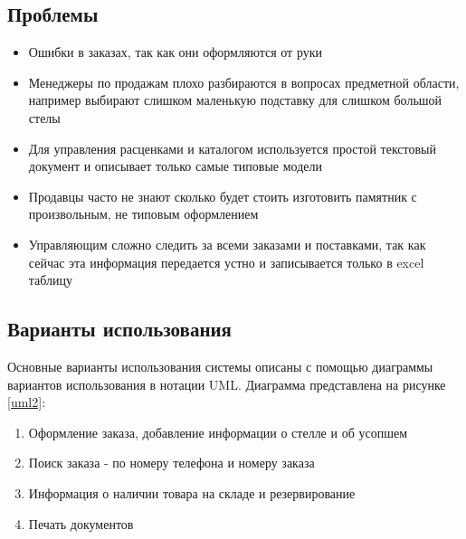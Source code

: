 \documentclass[a4paper,article,14pt]{extarticle}
\begin{document}
\subsection{Проблемы}
\begin{itemize}
    \item Ошибки в заказах, так как они оформляются от руки
    \item Менеджеры по продажам плохо разбираются в вопросах предметной области, 
    например выбирают слишком маленькую подставку для слишком большой стелы
    \item Для управления расценками и каталогом используется простой текстовый документ и описывает только самые типовые модели
    \item Продавцы часто не знают сколько будет стоить изготовить памятник с произвольным, не типовым оформлением
    \item Управляющим сложно следить за всеми заказами и поставками, 
    так как сейчас эта информация передается устно и записывается только в excel таблицу
\end{itemize}

\subsection{Варианты использования}

Основные варианты использования системы описаны с помощью диаграммы вариантов использования в нотации UML.
Диаграмма представлена на рисунке \ref{uml2}:

\begin{enumerate}
    \item Оформление заказа, добавление информации о стелле и об усопшем 
    \item Поиск заказа - по номеру телефона и номеру заказа
    \item Информация о наличии товара на складе и резервирование
    \item Печать документов
\end{enumerate}
\end{document}

